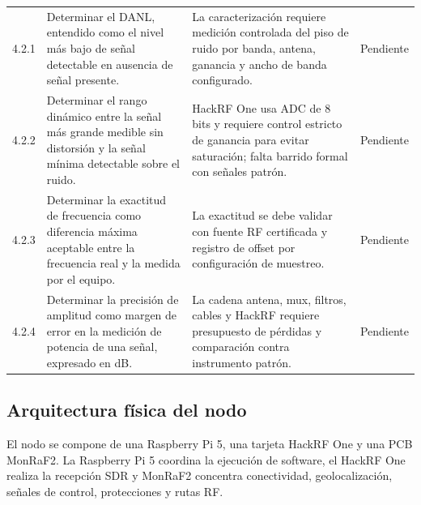 \begin{longtable}{@{}p{1.2cm} p{4.3cm} p{4.8cm} p{1.9cm}@{}}
4.2.1 & Determinar el DANL, entendido como el nivel más bajo de señal detectable en ausencia de señal presente. & La caracterización requiere medición controlada del piso de ruido por banda, antena, ganancia y ancho de banda configurado. & Pendiente \\
4.2.2 & Determinar el rango dinámico entre la señal más grande medible sin distorsión y la señal mínima detectable sobre el ruido. & HackRF One usa ADC de 8 bits y requiere control estricto de ganancia para evitar saturación; falta barrido formal con señales patrón. & Pendiente \\
4.2.3 & Determinar la exactitud de frecuencia como diferencia máxima aceptable entre la frecuencia real y la medida por el equipo. & La exactitud se debe validar con fuente RF certificada y registro de offset por configuración de muestreo. & Pendiente \\
4.2.4 & Determinar la precisión de amplitud como margen de error en la medición de potencia de una señal, expresado en dB. & La cadena antena, mux, filtros, cables y HackRF requiere presupuesto de pérdidas y comparación contra instrumento patrón. & Pendiente \\
\bottomrule
\end{longtable}
\setlength{\tabcolsep}{6pt}
\normalsize

\subsection{Arquitectura física del nodo}

El nodo se compone de una Raspberry Pi 5, una tarjeta HackRF One y una PCB
MonRaF2. La Raspberry Pi 5 coordina la ejecución de software, el HackRF One
realiza la recepción SDR y MonRaF2 concentra conectividad, geolocalización,
señales de control, protecciones y rutas RF.

